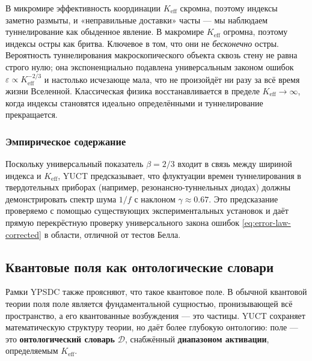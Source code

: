 \documentclass[12pt,a4paper]{article}
\theoremstyle{remark}
\begin{document}
	В микромире эффективность координации \(K_{\mathrm{eff}}\) скромна, поэтому индексы заметно размыты, и «неправильные доставки» часты — мы наблюдаем туннелирование как обыденное явление. В макромире \(K_{\mathrm{eff}}\) огромна, поэтому индексы остры как бритва. Ключевое в том, что они не \emph{бесконечно} остры. Вероятность туннелирования макроскопического объекта сквозь стену не равна строго нулю; она экспоненциально подавлена универсальным законом ошибок \(\varepsilon \propto K_{\mathrm{eff}}^{-2/3}\) и настолько исчезающе мала, что не произойдёт ни разу за всё время жизни Вселенной. Классическая физика восстанавливается в пределе \(K_{\mathrm{eff}} \to \infty\), когда индексы становятся идеально определёнными и туннелирование прекращается.
	
	\subsubsection{Эмпирическое содержание}
	
	Поскольку универсальный показатель $\beta=2/3$ входит в связь между шириной индекса и $K_{\mathrm{eff}}$, YUCT предсказывает, что флуктуации времен туннелирования в твердотельных приборах (например, резонансно-туннельных диодах) должны демонстрировать спектр шума $1/f$ с наклоном $\gamma \approx 0.67$. Это предсказание проверяемо с помощью существующих экспериментальных установок и даёт прямую перекрёстную проверку универсального закона ошибок \eqref{eq:error-law-corrected} в области, отличной от тестов Белла.
	
	\medskip
	
	\subsection{Квантовые поля как онтологические словари}
	
	Рамки YPSDC также проясняют, что такое квантовое поле. В обычной квантовой теории поля поле является фундаментальной сущностью, пронизывающей всё пространство, а его квантованные возбуждения — это частицы. YUCT сохраняет математическую структуру теории, но даёт более глубокую онтологию: поле — это \textbf{онтологический словарь} $\mathcal{D}$, снабжённый \textbf{диапазоном активации}, определяемым $K_{\mathrm{eff}}$.
	
\end{document}
